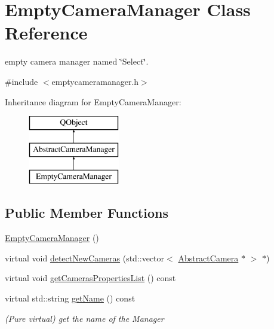 \hypertarget{class_empty_camera_manager}{}\section{Empty\+Camera\+Manager Class Reference}
\label{class_empty_camera_manager}


empty camera manager named \char`\"{}\+Select\char`\"{}.  




{\ttfamily \#include $<$emptycameramanager.\+h$>$}

Inheritance diagram for Empty\+Camera\+Manager\+:\begin{figure}[H]
\begin{center}
\leavevmode
\includegraphics[height=3.000000cm]{class_empty_camera_manager}
\end{center}
\end{figure}
\subsection*{Public Member Functions}
\begin{DoxyCompactItemize}
\item 
\mbox{\hyperlink{class_empty_camera_manager_a59d2ea5daf2dafe8d985bb168a1f7a58}{Empty\+Camera\+Manager}} ()
\item 
virtual void \mbox{\hyperlink{class_empty_camera_manager_ae32a44d1576763cf49d46dba3aef0007}{detect\+New\+Cameras}} (std\+::vector$<$ \mbox{\hyperlink{class_abstract_camera}{Abstract\+Camera}} $\ast$ $>$ $\ast$)
\item 
virtual void \mbox{\hyperlink{class_empty_camera_manager_a9378dbcd5782dc5ed032a022b9d18881}{get\+Cameras\+Properties\+List}} () const
\item 
virtual std\+::string \mbox{\hyperlink{class_empty_camera_manager_a9956650ba2c7ec4d18029c896311ac8e}{get\+Name}} () const
\begin{DoxyCompactList}\small\item\em (Pure virtual) get the name of the Manager \end{DoxyCompactList}\end{DoxyCompactItemize}
